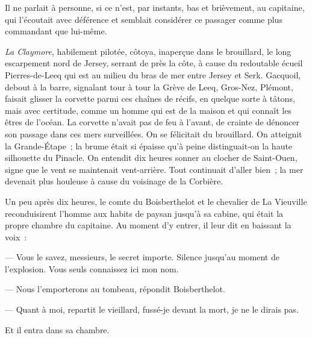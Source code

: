 \documentclass[french,twoside]{book} %
\begin{document}
Il ne parlait à personne, si ce n’est, par instants, bas et brièvement, au capitaine, qui l’écoutait avec déférence et semblait considérer ce passager comme plus commandant que lui-même.\par
\emph{La Claymore}, habilement pilotée, côtoya, inaperçue dans le brouillard, le long escarpement nord de Jersey, serrant de près la côte, à cause du redoutable écueil Pierres-de-Leeq qui est au milieu du bras de mer entre Jersey et Serk. Gacquoil, debout à la  barre, signalant tour à tour la Grève de Leeq, Gros-Nez, Plémont, faisait glisser la corvette parmi ces chaînes de récifs, en quelque sorte à tâtons, mais avec certitude, comme un homme qui est de la maison et qui connaît les êtres de l’océan. La corvette n’avait pas de feu à l’avant, de crainte de dénoncer son passage dans ces mers surveillées. On se félicitait du brouillard. On atteignit la Grande-Étape ; la brume était si épaisse qu’à peine distinguait-on la haute silhouette du Pinacle. On entendit dix heures sonner au clocher de Saint-Ouen, signe que le vent se maintenait vent-arrière. Tout continuait d’aller bien ; la mer devenait plus houleuse à cause du voisinage de la Corbière.\par
Un peu après dix heures, le comte du Boisberthelot et le chevalier de La Vieuville reconduisirent l’homme aux habits de paysan jusqu’à sa cabine, qui était la propre chambre du capitaine. Au moment d’y entrer, il leur dit en baissant la voix :\par
— Vous le savez, messieurs, le secret importe. Silence jusqu’au moment de l’explosion. Vous seuls connaissez ici mon nom.\par
— Nous l’emporterons au tombeau, répondit Boisberthelot.\par
— Quant à moi, repartit le vieillard, fussé-je devant la mort, je ne le dirais pas.\par
Et il entra dans sa chambre.
\end{document}
